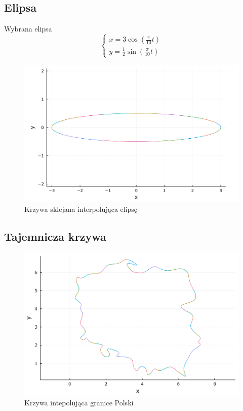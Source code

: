 \documentclass[11pt,wide]{article}
\begin{document}
\subsection{Elipsa}
Wybrana elipsa
\begin{equation}
    \begin{cases}
    x = 3\cos(\frac{\pi}{10} t)\\
    y = \frac{1}{2}\sin(\frac{\pi}{10} t)
    \end{cases}
\end{equation}
\begin{figure}[H]
    \centering
    \includegraphics[width=120mm]{elipsa.png}
    \caption{Krzywa sklejana interpolująca elipsę}
    \label{fig:my_label}
\end{figure}
\subsection{Tajemnicza krzywa}
\begin{figure}[H]
    \centering
    \includegraphics[width=120mm]{tajemnicza.png}
    \caption{Krzywa intepolująca granice Polski}
    \label{fig:my_label}
\end{figure}
\end{document}
